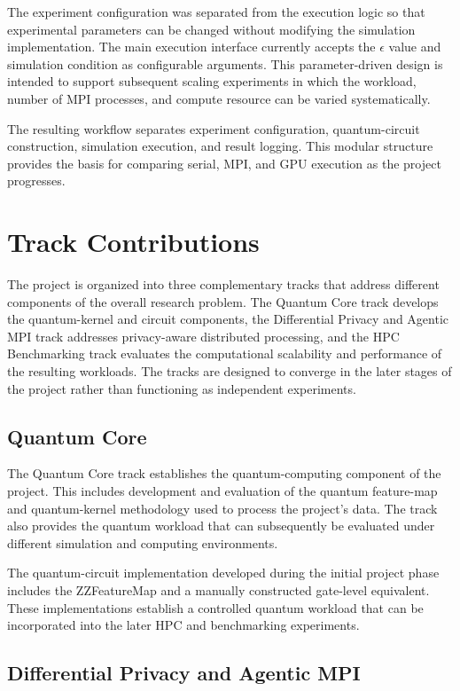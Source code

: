 \documentclass[pdflatex,sn-mathphys-num]{sn-jnl}%
\theoremstyle{thmstyleone}%
\theoremstyle{thmstyletwo}%
\theoremstyle{thmstylethree}%
\begin{document}
The experiment configuration was separated from the execution logic so that experimental parameters can be changed without modifying the simulation implementation. The main execution interface currently accepts the $\epsilon$ value and simulation condition as configurable arguments. This parameter-driven design is intended to support subsequent scaling experiments in which the workload, number of MPI processes, and compute resource can be varied systematically.

The resulting workflow separates experiment configuration, quantum-circuit construction, simulation execution, and result logging. This modular structure provides the basis for comparing serial, MPI, and GPU execution as the project progresses.

\section{Track Contributions}\label{sec:tracks}

The project is organized into three complementary tracks that address different components of the overall research problem. The Quantum Core track develops the quantum-kernel and circuit components, the Differential Privacy and Agentic MPI track addresses privacy-aware distributed processing, and the HPC Benchmarking track evaluates the computational scalability and performance of the resulting workloads. The tracks are designed to converge in the later stages of the project rather than functioning as independent experiments.

\subsection{Quantum Core}\label{subsec:quantum-core}

The Quantum Core track establishes the quantum-computing component of the project. This includes development and evaluation of the quantum feature-map and quantum-kernel methodology used to process the project's data. The track also provides the quantum workload that can subsequently be evaluated under different simulation and computing environments.

The quantum-circuit implementation developed during the initial project phase includes the ZZFeatureMap and a manually constructed gate-level equivalent. These implementations establish a controlled quantum workload that can be incorporated into the later HPC and benchmarking experiments.

\subsection{Differential Privacy and Agentic MPI}\label{subsec:dp-agentic}
\end{document}
